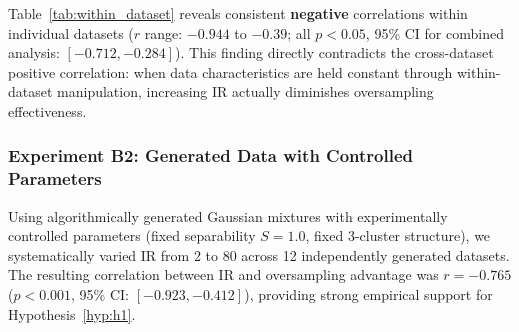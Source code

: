 \documentclass{ijSmartGrid}
\theoremstyle{definition}
\begin{document}
\indent Table~\ref{tab:within_dataset} reveals consistent \textbf{negative} correlations within individual datasets ($r$ range: $-0.944$ to $-0.39$; all $p < 0.05$, 95\% CI for combined analysis: $[-0.712, -0.284]$). This finding directly contradicts the cross-dataset positive correlation: when data characteristics are held constant through within-dataset manipulation, increasing IR actually diminishes oversampling effectiveness.

\subsubsection{Experiment B2: Generated Data with Controlled Parameters}
\indent Using algorithmically generated Gaussian mixtures with experimentally controlled parameters (fixed separability $S=1.0$, fixed 3-cluster structure), we systematically varied IR from 2 to 80 across 12 independently generated datasets. The resulting correlation between IR and oversampling advantage was $r = -0.765$ ($p < 0.001$, 95\% CI: $[-0.923, -0.412]$), providing strong empirical support for Hypothesis~\ref{hyp:h1}.
\end{document}
